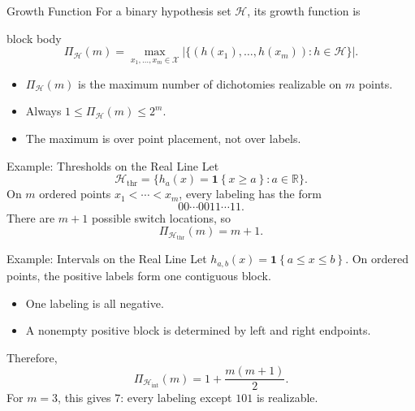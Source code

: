 \documentclass[aspectratio=169,10pt]{beamer}
\newcommand{\X}{\mathcal{X}}
\newcommand{\Hc}{\mathcal{H}}
\newcommand{\PiH}{\Pi_{\Hc}}
\newcommand{\ind}[1]{\mathbf{1}\!\left\{#1\right\}}
\newcommand{\abs}[1]{\left\lvert #1\right\rvert}
\begin{document}
\begin{frame}[t]{Growth Function}
  \vspace{0.04cm}
  For a binary hypothesis set $\Hc$, its growth function is
  \begin{beamercolorbox}[rounded=true,sep=0.20cm,wd=\linewidth]{block body}
    \[
      \boxed{
      \PiH(m)=
      \max_{x_1,\ldots,x_m\in\X}
      \abs{\bigl\{(h(x_1),\ldots,h(x_m)):h\in\Hc\bigr\}}.}
    \]
  \end{beamercolorbox}
  \vspace{0.15cm}
  \begin{itemize}
    \setlength{\itemsep}{0.10cm}
    \item $\PiH(m)$ is the maximum number of dichotomies realizable on $m$ points.
    \item Always $1\le\PiH(m)\le 2^m$.
    \item The maximum is over point placement, not over labels.
  \end{itemize}
\end{frame}

\begin{frame}[t]{Example: Thresholds on the Real Line}
  \vspace{0.02cm}
  Let
  \[
    \Hc_{\mathrm{thr}}=\{h_a(x)=\ind{x\ge a}:a\in\mathbb{R}\}.
  \]
  On $m$ ordered points $x_1<\cdots<x_m$, every labeling has the form
  \[
    00\cdots 0011\cdots 11.
  \]
  There are $m+1$ possible switch locations, so
  \[
    \boxed{\Pi_{\Hc_{\mathrm{thr}}}(m)=m+1.}
  \]
  \begin{center}
  \end{center}
\end{frame}

\begin{frame}[t]{Example: Intervals on the Real Line}
  \vspace{0.03cm}
  Let $h_{a,b}(x)=\ind{a\le x\le b}$. On ordered points, the positive labels form one contiguous block.
  \vspace{0.05cm}
  \begin{itemize}
    \setlength{\itemsep}{0.12cm}
    \item One labeling is all negative.
    \item A nonempty positive block is determined by left and right endpoints.
  \end{itemize}
  Therefore,
  \[
    \boxed{
    \Pi_{\Hc_{\mathrm{int}}}(m)
    =1+\frac{m(m+1)}{2}.}
  \]
  \vspace{0.04cm}
  For $m=3$, this gives $7$: every labeling except $101$ is realizable.
\end{frame}
\end{document}
